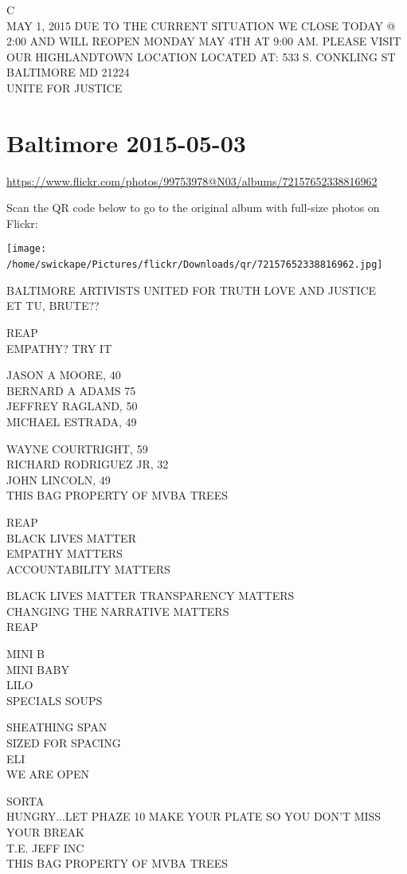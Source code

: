 \documentclass[10pt,letterpaper]{article}
\begin{document}
C\\
MAY 1, 2015  DUE TO THE CURRENT SITUATION WE CLOSE TODAY @ 2:00 AND WILL REOPEN MONDAY MAY 4TH AT 9:00 AM.  PLEASE VISIT OUR HIGHLANDTOWN LOCATION LOCATED AT: 533 S. CONKLING ST BALTIMORE MD 21224\\
UNITE FOR JUSTICE
\

\section*{Baltimore 2015-05-03}

\url{https://www.flickr.com/photos/99753978@N03/albums/72157652338816962}

Scan the QR code below to go to the original album with full-size photos on Flickr:

\texttt{[image: /home/swickape/Pictures/flickr/Downloads/qr/72157652338816962.jpg]}
\

BALTIMORE ARTIVISTS UNITED FOR TRUTH LOVE AND JUSTICE\\
ET TU, BRUTE??

REAP\\
EMPATHY?  TRY IT

JASON A MOORE, 40\\
BERNARD A ADAMS 75\\
JEFFREY RAGLAND, 50\\
MICHAEL ESTRADA, 49

WAYNE COURTRIGHT, 59\\
RICHARD RODRIGUEZ JR, 32\\
JOHN LINCOLN, 49\\
THIS BAG PROPERTY OF MVBA TREES

REAP\\
BLACK LIVES MATTER\\
EMPATHY MATTERS\\
ACCOUNTABILITY MATTERS

BLACK LIVES MATTER TRANSPARENCY MATTERS\\
CHANGING THE NARRATIVE MATTERS\\
REAP

MINI B\\
MINI BABY\\
LILO\\
SPECIALS SOUPS

SHEATHING SPAN\\
SIZED FOR SPACING\\
ELI\\
WE ARE OPEN

SORTA\\
HUNGRY...LET PHAZE 10 MAKE YOUR PLATE SO YOU DON'T MISS YOUR BREAK\\
T.E. JEFF INC\\
THIS BAG PROPERTY OF MVBA TREES
\end{document}
